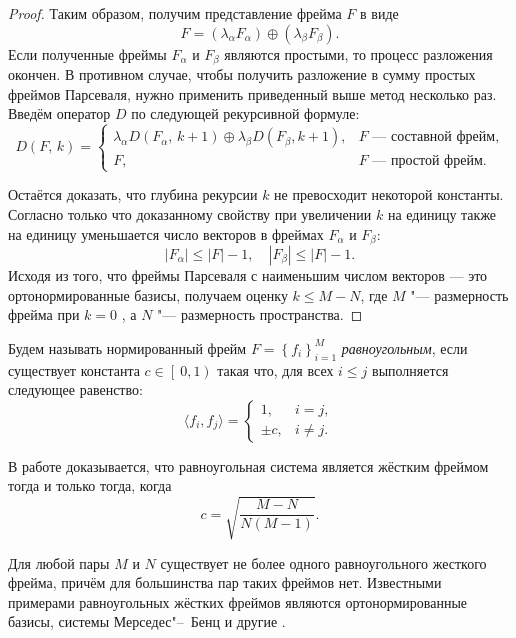 \begin{proof}
Таким образом, получим представление фрейма $F$ в виде
$$
F =(\lambda_{\alpha} F_\alpha) \oplus \left(\lambda_{\beta} F_\beta\right).
$$
Если полученные фреймы $F_\alpha$ и $F_\beta$ являются простыми, то процесс разложения окончен.
В противном случае, чтобы получить разложение в сумму простых фреймов Парсеваля, нужно применить
приведенный выше метод несколько раз. Введём оператор $D$ по следующей рекурсивной формуле:
$$
D(F,\,k) =
\left\{
\begin{array}{cl}
\lambda_{\alpha}  D(F_\alpha,\, k + 1) \oplus \lambda_{\beta}  D (F_\beta, k + 1), & F \text{ --- составной фрейм,} \\
F, & F \text{ --- простой фрейм.}
\end{array}\right.
$$

Остаётся доказать, что глубина рекурсии $k$ не превосходит некоторой константы. Согласно только что доказанному свойству
 при увеличении $k$ на единицу также на единицу уменьшается число векторов в фреймах $F_\alpha$ и $F_\beta$:
$$
|F_\alpha| \leq |F| - 1, \quad |F_\beta| \leq |F| - 1.
$$
Исходя из того, что фреймы Парсеваля с наименьшим числом векторов --- это ортонормированные базисы, получаем оценку
$k \leq M - N$, где $M$ "--- размерность фрейма при $k = 0$ , а $N$ "--- размерность пространства.
\end{proof}


\smallskip
{}

\begin{definition}
Будем называть нормированный фрейм $F = \left\{f_i\right\}_{i=1}^M$ {\it равноугольным}, если существует константа
$c \in \left[\:0,1\right)$ такая что, для всех $i \leq j$ выполняется следующее равенство:
$$
\langle f_i, f_j\rangle =
\left\{
\begin{array}{rl}
1, &i = j, \\
\pm  c, & i \neq j.
\end{array}
\right.
$$
\end{definition}

В работе \cite{ryabtsov:Equ} доказывается, что равноугольная система является жёстким фреймом тогда и только тогда, когда
$$
c = \sqrt{\frac{M - N}{N(M - 1)}}.
$$

Для любой пары $M$ и $N$ существует не более одного равноугольного жесткого фрейма, причём для большинства пар таких фреймов нет.
Известными примерами равноугольных жёстких фреймов являются ортонормированные базисы, системы Мерседес"--~Бенц и другие \cite{ryabtsov:Equ}.

